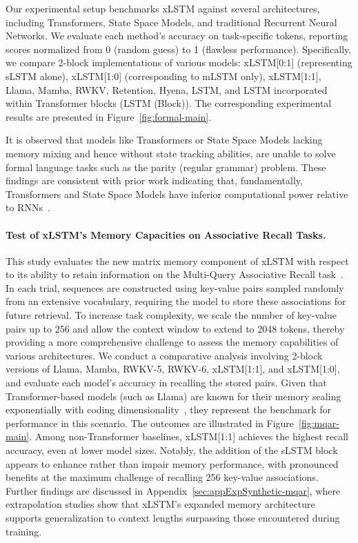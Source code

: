 Our experimental setup benchmarks xLSTM against several architectures, including Transformers, State Space Models, and traditional Recurrent Neural Networks. We evaluate each method’s accuracy on task-specific tokens, reporting scores normalized from 0 (random guess) to 1 (flawless performance). Specifically, we compare 2-block implementations of various models: xLSTM[0:1] (representing sLSTM alone), xLSTM[1:0] (corresponding to mLSTM only), xLSTM[1:1], Llama, Mamba, RWKV, Retention, Hyena, LSTM, and LSTM incorporated within Transformer blocks (LSTM (Block)). The corresponding experimental results are presented in Figure~\ref{fig:formal-main}.

It is observed that models like Transformers or State Space Models lacking memory mixing and hence without state tracking abilities, are unable to solve formal language tasks such as the parity (regular grammar) problem. These findings are consistent with prior work indicating that, fundamentally, Transformers and State Space Models have inferior computational power relative to RNNs~\citep{Merrill:24, Merrill:23, Deletang:23}.

\paragraph{Test of xLSTM's Memory Capacities on Associative Recall Tasks.} This study evaluates the new matrix memory component of xLSTM with respect to its ability to retain information on the Multi-Query Associative Recall task~\citep{Arora:23arxiv}. In each trial, sequences are constructed using key-value pairs sampled randomly from an extensive vocabulary, requiring the model to store these associations for future retrieval. To increase task complexity, we scale the number of key-value pairs up to 256 and allow the context window to extend to 2048 tokens, thereby providing a more comprehensive challenge to assess the memory capabilities of various architectures. We conduct a comparative analysis involving 2-block versions of Llama, Mamba, RWKV-5, RWKV-6, xLSTM[1:1], and xLSTM[1:0], and evaluate each model’s accuracy in recalling the stored pairs. Given that Transformer-based models (such as Llama) are known for their memory scaling exponentially with coding dimensionality~\citep{Ramsauer:21}, they represent the benchmark for performance in this scenario. The outcomes are illustrated in Figure~\ref{fig:mqar-main}. 
Among non-Transformer baselines, xLSTM[1:1] achieves the highest recall accuracy, even at lower model sizes. Notably, the addition of the sLSTM block appears to enhance rather than impair memory performance, with pronounced benefits at the maximum challenge of recalling 256 key-value associations. Further findings are discussed in Appendix~\ref{sec:appExpSynthetic-mqar}, where extrapolation studies show that xLSTM’s expanded memory architecture supports generalization to context lengths surpassing those encountered during training.

